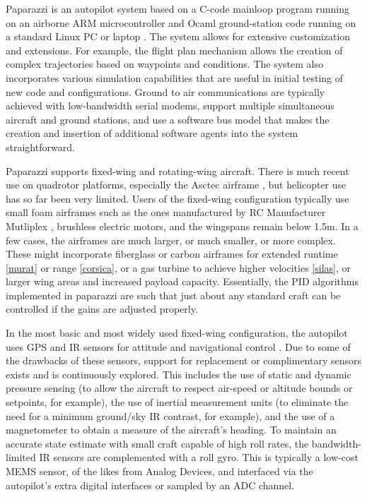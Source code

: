 \documentclass[a4paper,11pt]{report}
\begin{document}
Paparazzi is an autopilot system based on a C-code mainloop program running on an airborne ARM microcontroller and Ocaml ground-station code running on a standard Linux PC or laptop \cite{paparazzi}. The system allows for extensive customization and extensions. For example, the flight plan mechanism allows the creation of complex trajectories based on waypoints and conditions. The system also incorporates various simulation capabilities that are useful in initial testing of new code and configurations. Ground to air communications are typically achieved with low-bandwidth serial modems, support multiple simultaneous aircraft and ground stations, and use a software bus model that makes the creation and insertion of additional software agents into the system straightforward. 

Paparazzi supports fixed-wing and rotating-wing aircraft. There is much recent use on quadrotor platforms, especially the Asctec airframe \cite{asctec}, but helicopter use has so far been very limited. Users of the fixed-wing configuration typically use small foam airframes such as the ones manufactured by RC Manufacturer Mutliplex \cite{multiplex}, brushless electric motors, and the wingspans remain below 1.5m. In a few cases, the airframes are much larger, or much smaller, or more complex. These might incorporate fiberglass or carbon airframes for extended runtime \ref{murat} or range \ref{corsica}, or a gas turbine to achieve higher velocities \ref{silas}, or larger wing areas and increased payload capacity. Essentially, the PID algorithms implemented in paparazzi are such that just about any standard craft can be controlled if the gains are adjusted properly.

In the most basic and most widely used fixed-wing configuration, the autopilot uses GPS and IR sensors for attitude and navigational control \cite{paparazzi_paper}. Due to some of the drawbacks of these sensors, support for replacement or complimentary sensors exists and is continuously explored. This includes the use of static and dynamic pressure sensing (to allow the aircraft to respect air-speed or altitude bounds or setpoints, for example), the use of inertial measurement units (to eliminate the need for a minimum ground/sky IR contrast, for example), and the use of a magnetometer to obtain a measure of the aircraft's heading. To maintain an accurate state estimate with small craft capable of high roll rates, the bandwidth-limited IR sensors are complemented with a roll gyro. This is typically a low-cost MEMS sensor, of the likes from Analog Devices, and interfaced via the autopilot's extra digital interfaces or sampled by an ADC channel.
\end{document}
